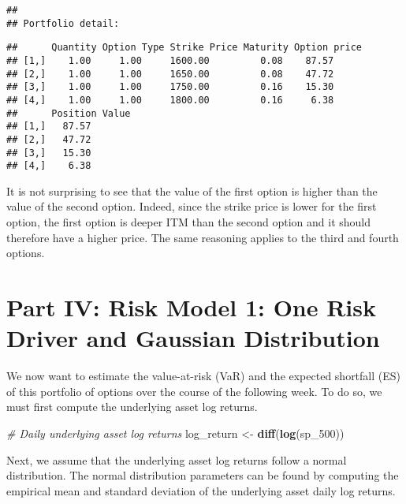 \documentclass[]{article}
\newenvironment{Shaded}{\begin{snugshade}}{\end{snugshade}}
\newcommand{\CommentTok}[1]{\textcolor[rgb]{0.56,0.35,0.01}{\textit{#1}}}
\newcommand{\DecValTok}[1]{\textcolor[rgb]{0.00,0.00,0.81}{#1}}
\newcommand{\KeywordTok}[1]{\textcolor[rgb]{0.13,0.29,0.53}{\textbf{#1}}}
\newcommand{\NormalTok}[1]{#1}
\newcommand{\StringTok}[1]{\textcolor[rgb]{0.31,0.60,0.02}{#1}}
\begin{document}
\begin{verbatim}
## 
## Portfolio detail:
\end{verbatim}

\begin{verbatim}
##      Quantity Option Type Strike Price Maturity Option price
## [1,]    1.00     1.00     1600.00         0.08    87.57     
## [2,]    1.00     1.00     1650.00         0.08    47.72     
## [3,]    1.00     1.00     1750.00         0.16    15.30     
## [4,]    1.00     1.00     1800.00         0.16     6.38     
##      Position Value
## [1,]   87.57       
## [2,]   47.72       
## [3,]   15.30       
## [4,]    6.38
\end{verbatim}

It is not surprising to see that the value of the first option is higher
than the value of the second option. Indeed, since the strike price is
lower for the first option, the first option is deeper ITM than the
second option and it should therefore have a higher price. The same
reasoning applies to the third and fourth options.

\hypertarget{part-iv-risk-model-1-one-risk-driver-and-gaussian-distribution}{%
\section{Part IV: Risk Model 1: One Risk Driver and Gaussian
Distribution}\label{part-iv-risk-model-1-one-risk-driver-and-gaussian-distribution}}

We now want to estimate the value-at-risk (VaR) and the expected
shortfall (ES) of this portfolio of options over the course of the
following week. To do so, we must first compute the underlying asset log
returns.

\begin{Shaded}
\begin{Highlighting}[]
\CommentTok{\# Daily underlying asset log returns}
\NormalTok{log\_return <{-}}\StringTok{ }\KeywordTok{diff}\NormalTok{(}\KeywordTok{log}\NormalTok{(sp\_}\DecValTok{500}\NormalTok{))}
\end{Highlighting}
\end{Shaded}

Next, we assume that the underlying asset log returns follow a normal
distribution. The normal distribution parameters can be found by
computing the empirical mean and standard deviation of the underlying
asset daily log returns.
\end{document}
